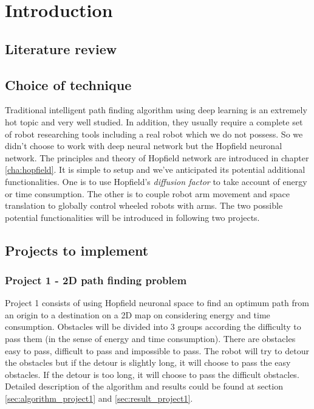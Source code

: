\chapter{Introduction}
\label{cha:introduction}
\section{Literature review}
\label{sec:review}

\section{Choice of technique}
\label{sec:choice}
Traditional intelligent path finding algorithm using deep learning is an extremely hot topic and very well studied.
In addition, they usually require a complete set of robot researching tools including a real robot which we do not possess.
So we didn't choose to work with deep neural network but the Hopfield neuronal network.
The principles and theory of Hopfield network are introduced in chapter \ref{cha:hopfield}.
It is simple to setup and we've anticipated its potential additional functionalities.
One is to use Hopfield's \textit{diffusion factor} to take account of energy or time consumption.
The other is to couple robot arm movement and space translation to globally control wheeled robots with arms.
The two possible potential functionalities will be introduced in following two projects.


\section{Projects to implement}
\label{sec:projects}

\subsection{Project 1 - 2D path finding problem}
\label{ssec:project1}

Project 1 consists of using Hopfield neuronal space to find an optimum path from an origin to a destination on a 2D map
on considering energy and time consumption.
Obstacles will be divided into 3 groups according the difficulty to pass them (in the sense of energy and time consumption).
There are obstacles easy to pass, difficult to pass and impossible to pass.
The robot will try to detour the obstacles but if the detour is slightly long, it will choose to pass the easy obstacles.
If the detour is too long, it will choose to pass the difficult obstacles.
Detailed description of the algorithm and results could be found at section \ref{sec:algorithm_project1} and
\ref{sec:result_project1}.


